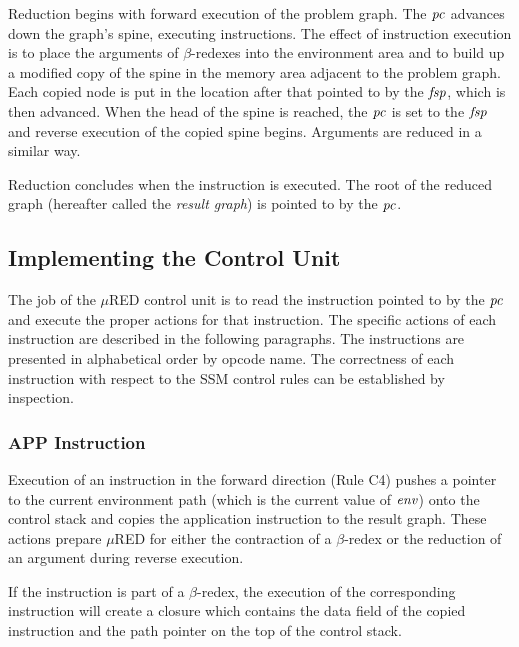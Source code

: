 Reduction begins with forward execution of the problem graph. The \(\mathit{pc}\) advances down the graph's spine, executing instructions. The effect of instruction execution is to place the arguments of \(\beta\)-redexes into the environment area and to build up a modified copy of the spine in the memory area adjacent to the problem graph. Each copied node is put in the location after that pointed to by the \(\mathit{fsp}\), which is then advanced. When the head of the spine is reached, the \(\mathit{pc}\) is set to the \(\mathit{fsp}\) and reverse execution of the copied spine begins. Arguments are reduced in a similar way.


Reduction concludes when the  instruction is executed. The root of the reduced graph (hereafter called the \emph{result graph}) is pointed to by the \(\mathit{pc}\).

\subsection{Implementing the Control Unit}

The job of the \(\mu\)RED control unit is to read the instruction pointed to by the \(\mathit{pc}\) and execute the proper actions for that instruction. The specific actions of each instruction are described in the following paragraphs. The instructions are presented in alphabetical order by opcode name. The correctness of each instruction with respect to the SSM control rules can be established by inspection.

\subsubsection*{APP Instruction}

Execution of an  instruction in the forward direction (Rule C4) pushes a pointer to the current environment path (which is the current value of \(\mathit{env}\)) onto the control stack and copies the application instruction to the result graph. These actions prepare \(\mu\)RED for either the contraction of a \(\beta\)-redex or the reduction of an argument during reverse execution.

If the  instruction is part of a \(\beta\)-redex, the execution of the corresponding  instruction will create a closure which contains the data field of the copied  instruction and the path pointer on the top of the control stack.

